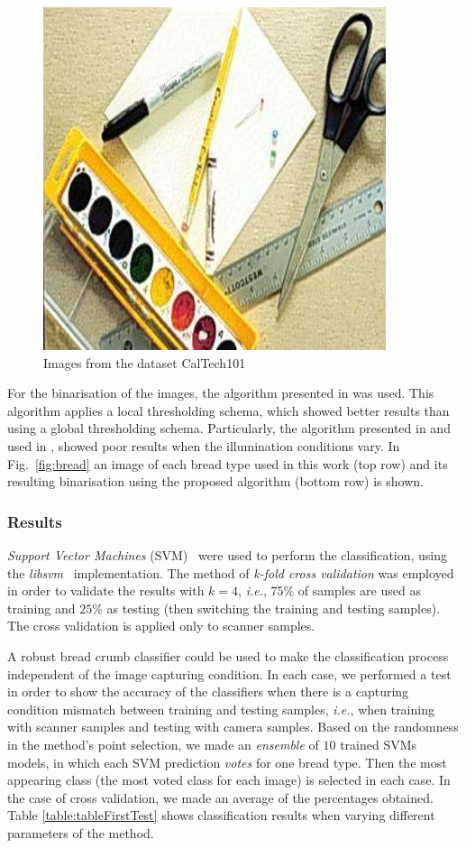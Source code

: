 \documentclass[oneside,a4paper,english,links,12pt]{article}
\begin{document}
\begin{figure}[htb]
\includegraphics[scale=0.20]{imagenes/image_0048}
\caption{Images from the dataset CalTech101}
\label{fig:nonbread}
\end{figure}

For the binarisation of the images, the algorithm presented in \cite{White83} was used. This algorithm applies a local thresholding schema, which showed better results than using a global thresholding schema. Particularly, the algorithm presented in \cite{Huang95} and used in \cite{Gonzales2008}, showed poor results when the illumination conditions vary. In Fig.~\ref{fig:bread} an image of each bread type used in this work (top row) and its resulting binarisation using the proposed algorithm (bottom row) is shown.  

\subsubsection{Results}

{\em Support Vector Machines} (SVM)~\cite{Boser92} were used to perform the classification, using the {\em libsvm}~\cite{Chang2011} implementation. The method of {\em k-fold cross validation} was employed in order to validate the results with $k = 4$, {\em i.e.}, $75\%$ of samples are used as training and $25\%$ as testing (then switching the training and testing samples). The cross validation is applied only to scanner samples.

A robust bread crumb classifier could be used to make the classification process independent of the image capturing condition. In each case, we performed a test in order to show the accuracy of the classifiers when there is a capturing condition mismatch between training and testing samples, {\em i.e.}, when training with scanner samples and testing with camera samples. Based on the randomness in the method's point selection, we made an {\em ensemble} of $10$ trained SVMs models, in which each SVM prediction {\em votes} for one bread type. Then the most appearing class (the most voted class for each image) is selected in each case. In the case of cross validation, we made an average of the percentages obtained. Table \ref{table:tableFirstTest} shows classification results when varying different parameters of the method.
\end{document}
